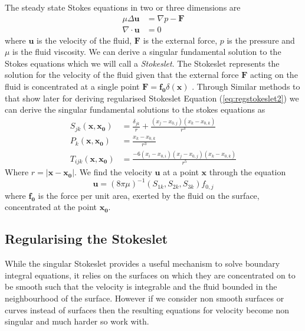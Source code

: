The steady state Stokes equations in two or three dimensions are
\begin{subequations}
\label{eq:StokesFlow}
\begin{align}
    \mu\Delta\boldsymbol{u} &= \nabla p - \boldsymbol{F} \label{eq:StokesFlow1} \\ 
    \nabla \cdot \boldsymbol{u} &= 0 \label{eq:StokesFlow2}
\end{align}
\end{subequations}
where $\mathbf{u}$ is the velocity of the fluid, $\mathbf{F}$ is the external force, $p$ is the pressure and $\mu$ is the fluid viscosity.
We can derive a singular fundamental solution to the Stokes equations which we will call a \textit{Stokeslet}. The Stokeslet represents the solution for the velocity of the fluid given that the external force $\mathbf{F}$ acting on the fluid is concentrated at a single point $\mathbf{F} = \mathbf{f_0}\delta(\mathbf{x})$ \cite{Hancock1953TheLiquids, Batchelor2000AnDynamics, Pozrikidis1992BoundaryFlow}.
Through Similar methods to that show later for deriving regularised Stokeslet Equation (\cref{eq:regstokeslet2}) we can derive the singular fundamental solutions to the stokes equations as 
\begin{equation*}
\begin{aligned}
    S_{j k}(\mathbf{x}, \mathbf{x_0}) &= \frac{\delta_{j k}}{r}+\frac{\left(x_{j}-x_{0,j}\right)\left(x_{k}-x_{0,k}\right)}{r^{3}} \\
    P_{k}(\mathbf{x}, \mathbf{x_0}) &= \frac{x_{k}-x_{0,k}}{r^{3}} \\
    T_{ijk}(\mathbf{x}, \mathbf{x_0}) &= \frac{-6\left(x_{i}-x_{0,i}\right)\left(x_{j}-x_{0,j}\right)\left(x_{k}-x_{0,k}\right)}{r^5}
\end{aligned}
\end{equation*}
Where $r=|\mathbf{x}-\mathbf{x_0}|$. We find the velocity $\mathbf{u}$ at a point $\mathbf{x}$ through the equation  
\begin{equation*}
    \mathbf{u} = (8 \pi \mu)^{-1} \left(S_{1k},S_{2k},S_{3k}\right)f_{0,j}
\end{equation*} 
where $\mathbf{f_{0}}$ is the force per unit area, exerted by the fluid on the surface, concentrated at the point $\mathbf{x_0}$.


\subsection{Regularising the Stokeslet}
While the singular Stokeslet provides a useful mechanism to solve boundary integral equations, it relies on the surfaces on which they are concentrated on to be smooth such that the velocity is integrable and the fluid bounded in the neighbourhood of the surface. However if we consider non smooth surfaces or curves instead of surfaces then the resulting equations for velocity become non singular and much harder so work with. 

